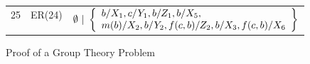 \begin{figure}[t]
\begin{center}
\begin{tabular}{clc}
  25 & ER(24) &
  $ \clauseWithSubst{
      \emptyset
    }{ \left\{
      \begin{array}{l}
        \mapVar{X_1}b, \mapVar{Y_1}c, \mapVar{Z_1}b, \mapVar{X_5}b,  \\
        \mapVar{X_2}{m(b)}, \mapVar{Y_2}{b}, \mapVar{Z_2}{f(c,b)},
           \mapVar{X_3}{b}, \mapVar{X_6}{f(c,b)}
      \end{array} \right\}
    }$
\end{tabular}
\caption{Proof of a Group Theory Problem}
\label{fig:unit-sup-proof-example}
\end{center}
\end{figure}
